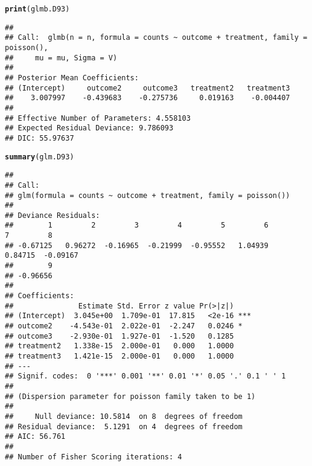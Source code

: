\documentclass{article}\usepackage[]{graphicx}\usepackage[]{color}
\makeatletter
\newcommand{\hlstd}[1]{\textcolor[rgb]{0.345,0.345,0.345}{#1}}%
\newcommand{\hlkwd}[1]{\textcolor[rgb]{0.737,0.353,0.396}{\textbf{#1}}}%
\newenvironment{kframe}{%
 \def\at@end@of@kframe{}%
 \ifinner\ifhmode%
  \def\at@end@of@kframe{\end{minipage}}%
  \begin{minipage}{\columnwidth}%
 \fi\fi%
 \def\FrameCommand##1{\hskip\@totalleftmargin \hskip-\fboxsep
 \colorbox{shadecolor}{##1}\hskip-\fboxsep
     \hskip-\linewidth \hskip-\@totalleftmargin \hskip\columnwidth}%
 \MakeFramed {\advance\hsize-\width
   \@totalleftmargin\z@ \linewidth\hsize
   \@setminipage}}%
 {\par\unskip\endMakeFramed%
 \at@end@of@kframe}
\newenvironment{knitrout}{}{} %
\makeatother
\begin{document}
\begin{knitrout}
\color{fgcolor}\begin{kframe}
\begin{alltt}
\hlkwd{print}\hlstd{(glmb.D93)}
\end{alltt}
\begin{verbatim}
## 
## Call:  glmb(n = n, formula = counts ~ outcome + treatment, family = poisson(), 
##     mu = mu, Sigma = V)
## 
## Posterior Mean Coefficients:
## (Intercept)     outcome2     outcome3   treatment2   treatment3  
##    3.007997    -0.439683    -0.275736     0.019163    -0.004407  
## 
## Effective Number of Parameters: 4.558103 
## Expected Residual Deviance: 9.786093 
## DIC: 55.97637
\end{verbatim}
\end{kframe}
\end{knitrout}


\begin{knitrout}
\color{fgcolor}\begin{kframe}
\begin{alltt}
\hlkwd{summary}\hlstd{(glm.D93)}
\end{alltt}
\begin{verbatim}
## 
## Call:
## glm(formula = counts ~ outcome + treatment, family = poisson())
## 
## Deviance Residuals: 
##        1         2         3         4         5         6         7         8  
## -0.67125   0.96272  -0.16965  -0.21999  -0.95552   1.04939   0.84715  -0.09167  
##        9  
## -0.96656  
## 
## Coefficients:
##               Estimate Std. Error z value Pr(>|z|)    
## (Intercept)  3.045e+00  1.709e-01  17.815   <2e-16 ***
## outcome2    -4.543e-01  2.022e-01  -2.247   0.0246 *  
## outcome3    -2.930e-01  1.927e-01  -1.520   0.1285    
## treatment2   1.338e-15  2.000e-01   0.000   1.0000    
## treatment3   1.421e-15  2.000e-01   0.000   1.0000    
## ---
## Signif. codes:  0 '***' 0.001 '**' 0.01 '*' 0.05 '.' 0.1 ' ' 1
## 
## (Dispersion parameter for poisson family taken to be 1)
## 
##     Null deviance: 10.5814  on 8  degrees of freedom
## Residual deviance:  5.1291  on 4  degrees of freedom
## AIC: 56.761
## 
## Number of Fisher Scoring iterations: 4
\end{verbatim}
\end{kframe}
\end{knitrout}
\end{document}
